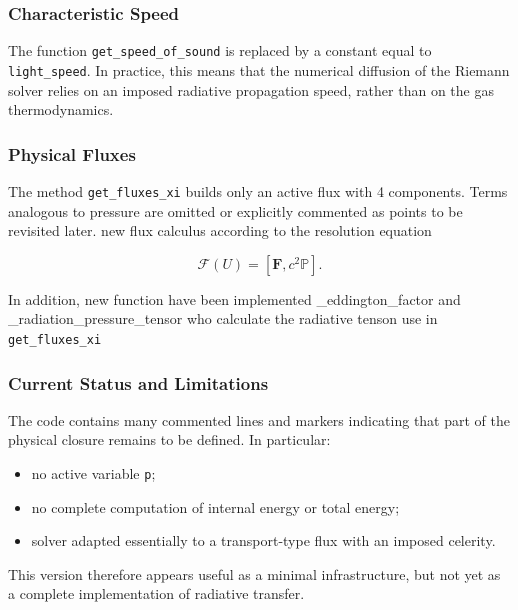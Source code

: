 \documentclass[a4paper, 11pt]{article}
\begin{document}
\subsubsection*{Characteristic Speed}
The function \texttt{get\_speed\_of\_sound} is replaced by a constant equal to \texttt{light\_speed}. In practice, this means that the numerical diffusion of the Riemann solver relies on an imposed radiative propagation speed, rather than on the gas thermodynamics.

\subsubsection*{Physical Fluxes}
The method \texttt{get\_fluxes\_xi} builds only an active flux with 4 components. Terms analogous to pressure are omitted or explicitly commented as points to be revisited later. new flux calculus according to the resolution equation 

\begin{equation}
    \mathcal{F}(U) = [\mathbf{F}, c^2 \mathbb{P}].
    \label{eq:placeholder_label}
\end{equation} 

In addition, new function have been implemented \_eddington\_factor and \_radiation\_pressure\_tensor who calculate the radiative tenson use in \texttt{get\_fluxes\_xi} 

\subsubsection*{Current Status and Limitations}
The code contains many commented lines and markers indicating that part of the physical closure remains to be defined. In particular:
\begin{itemize}
    \item no active variable \texttt{p};
    \item no complete computation of internal energy or total energy;
    \item solver adapted essentially to a transport-type flux with an imposed celerity.
\end{itemize}

This version therefore appears useful as a minimal infrastructure, but not yet as a complete implementation of radiative transfer.
\end{document}
